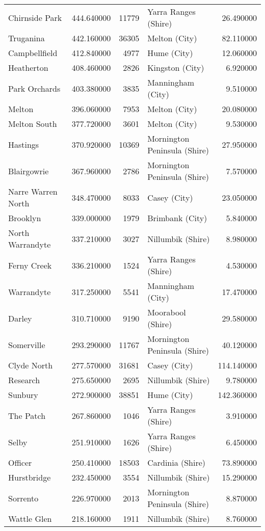 \begin{longtable}{lrrlr}
Chirnside Park & 444.640000 & 11779 & Yarra Ranges (Shire) & 26.490000 \\
Truganina & 442.160000 & 36305 & Melton (City) & 82.110000 \\
Campbellfield & 412.840000 & 4977 & Hume (City) & 12.060000 \\
Heatherton & 408.460000 & 2826 & Kingston (City) & 6.920000 \\
Park Orchards & 403.380000 & 3835 & Manningham (City) & 9.510000 \\
Melton & 396.060000 & 7953 & Melton (City) & 20.080000 \\
Melton South & 377.720000 & 3601 & Melton (City) & 9.530000 \\
Hastings & 370.920000 & 10369 & Mornington Peninsula (Shire) & 27.950000 \\
Blairgowrie & 367.960000 & 2786 & Mornington Peninsula (Shire) & 7.570000 \\
Narre Warren North & 348.470000 & 8033 & Casey (City) & 23.050000 \\
Brooklyn & 339.000000 & 1979 & Brimbank (City) & 5.840000 \\
North Warrandyte & 337.210000 & 3027 & Nillumbik (Shire) & 8.980000 \\
Ferny Creek & 336.210000 & 1524 & Yarra Ranges (Shire) & 4.530000 \\
Warrandyte & 317.250000 & 5541 & Manningham (City) & 17.470000 \\
Darley & 310.710000 & 9190 & Moorabool (Shire) & 29.580000 \\
Somerville & 293.290000 & 11767 & Mornington Peninsula (Shire) & 40.120000 \\
Clyde North & 277.570000 & 31681 & Casey (City) & 114.140000 \\
Research & 275.650000 & 2695 & Nillumbik (Shire) & 9.780000 \\
Sunbury & 272.900000 & 38851 & Hume (City) & 142.360000 \\
The Patch & 267.860000 & 1046 & Yarra Ranges (Shire) & 3.910000 \\
Selby & 251.910000 & 1626 & Yarra Ranges (Shire) & 6.450000 \\
Officer & 250.410000 & 18503 & Cardinia (Shire) & 73.890000 \\
Hurstbridge & 232.450000 & 3554 & Nillumbik (Shire) & 15.290000 \\
Sorrento & 226.970000 & 2013 & Mornington Peninsula (Shire) & 8.870000 \\
Wattle Glen & 218.160000 & 1911 & Nillumbik (Shire) & 8.760000 \\

\end{longtable}
